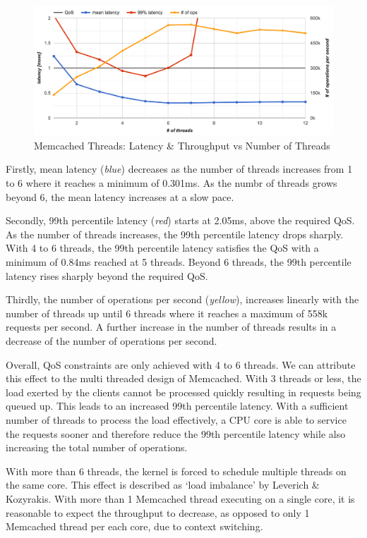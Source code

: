 \begin{figure}[h]
    \includegraphics[width=\textwidth]{./res2/m_threads_latency.png}
    \caption{Memcached Threads: Latency \& Throughput vs Number of Threads}
    \label{fig:m_threads_latency.png}
\end{figure}

Firstly, mean latency (\textit{blue}) decreases as the number of threads increases from 1 to 6 where it reaches a minimum of 0.301ms. As the numbr of threads grows beyond 6, the mean latency increases at a slow pace.

Secondly, 99th percentile latency (\textit{red}) starts at 2.05ms, above the required QoS. As the number of threads increases, the 99th percentile latency drops sharply. With 4 to 6 threads, the 99th percentile latency satisfies the QoS with a minimum of 0.84ms reached at 5 threads. Beyond 6 threads, the 99th percentile latency rises sharply beyond the required QoS.

Thirdly, the number of operations per second (\textit{yellow}), increases linearly with the number of threads up until 6 threads where it reaches a maximum of 558k requests per second. A further increase in the number of threads results in a decrease of the number of operations per second.

Overall, QoS constraints are only achieved with 4 to 6 threads. We can attribute this effect to the multi threaded design of Memcached. With 3 threads or less, the load exerted by the clients cannot be processed quickly resulting in requests being queued up. This leads to an increased 99th percentile latency. With a sufficient number of threads to process the load effectively, a CPU core is able to service the requests sooner and therefore reduce the 99th percentile latency while also increasing the total number of operations.

With more than 6 threads, the kernel is forced to schedule multiple threads on the same core. This effect is described as `load imbalance' by Leverich \& Kozyrakis. With more than 1 Memcached thread executing on a single core, it is reasonable to expect the throughput to decrease, as opposed to only 1 Memcached thread per each core, due to context switching.

